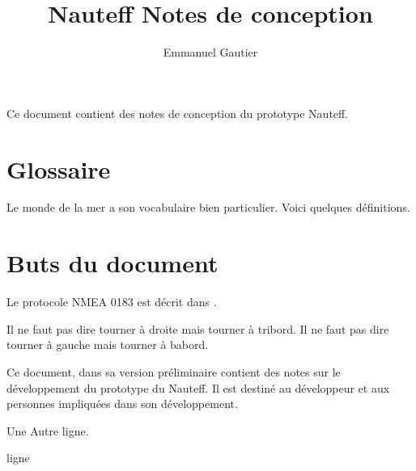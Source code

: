 \documentclass[a4paper,11pt]{article}
\title{Nauteff Notes de conception}
\author{Emmanuel Gautier}
\begin{document}
	
	
	
	\maketitle
	
    Ce document contient des notes de conception du prototype Nauteff.
	\section{Glossaire}
	Le monde de la mer a son vocabulaire bien particulier. Voici quelques définitions.
        \printglossaries
	
	\section{Buts du document}



	Le protocole NMEA 0183 est décrit dans \cite{NMEARevealed}.
	
    Il ne faut pas dire tourner à droite mais tourner à \gls{tribord}.
    Il ne faut pas dire tourner à gauche mais tourner à \gls{babord}.
	
	Ce document, dans sa version préliminaire contient des notes
	sur le développement du prototype du Nauteff.
	Il est destiné au développeur et aux personnes impliquées dans son
	développement.

Une Autre ligne.


ligne
	
	\printbibliography	
	
\end{document}
